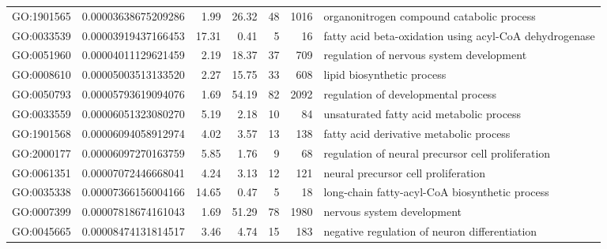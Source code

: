 \documentclass[letterpaper,12pt]{article}
\numberwithin{equation}{appendix}
\begin{document}
\begin{landscape}
{{\begin{longtable}{lrrrrrl}
  GO:1901565 & 0.00003638675209286 & 1.99 & 26.32 & 48 & 1016 & organonitrogen compound catabolic process \\ 
  GO:0033539 & 0.00003919437166453 & 17.31 & 0.41 & 5 & 16 & fatty acid beta-oxidation using acyl-CoA dehydrogenase \\ 
  GO:0051960 & 0.00004011129621459 & 2.19 & 18.37 & 37 & 709 & regulation of nervous system development \\ 
  GO:0008610 & 0.00005003513133520 & 2.27 & 15.75 & 33 & 608 & lipid biosynthetic process \\ 
  GO:0050793 & 0.00005793619094076 & 1.69 & 54.19 & 82 & 2092 & regulation of developmental process \\ 
  GO:0033559 & 0.00006051323080270 & 5.19 & 2.18 & 10 & 84 & unsaturated fatty acid metabolic process \\ 
  GO:1901568 & 0.00006094058912974 & 4.02 & 3.57 & 13 & 138 & fatty acid derivative metabolic process \\ 
  GO:2000177 & 0.00006097270163759 & 5.85 & 1.76 & 9 & 68 & regulation of neural precursor cell proliferation \\ 
  GO:0061351 & 0.00007072446668041 & 4.24 & 3.13 & 12 & 121 & neural precursor cell proliferation \\ 
  GO:0035338 & 0.00007366156004166 & 14.65 & 0.47 & 5 & 18 & long-chain fatty-acyl-CoA biosynthetic process \\ 
  GO:0007399 & 0.00007818674161043 & 1.69 & 51.29 & 78 & 1980 & nervous system development \\ 
  GO:0045665 & 0.00008474131814517 & 3.46 & 4.74 & 15 & 183 & negative regulation of neuron differentiation \\ 
   \bottomrule
\end{longtable}
}}
\end{landscape}
\end{document}
